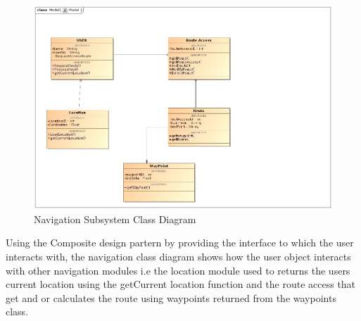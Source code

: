 \documentclass{article}
\begin{document}
							\begin{figure}[H]
					\includegraphics[scale=0.5]{Diagrams/Class_Diagram_Navigation.JPG}
					\caption{Navigation Subsystem Class Diagram}	
				\end{figure}
				{Using the Composite design partern by providing the interface to which the user interacts with, the navigation class diagram shows how the user object interacts with other navigation  modules i.e the location module used to returns the users current location using the getCurrent location function and the route access that get and or calculates the route using waypoints returned from the waypoints class.\\\\}
			
\end{document}
